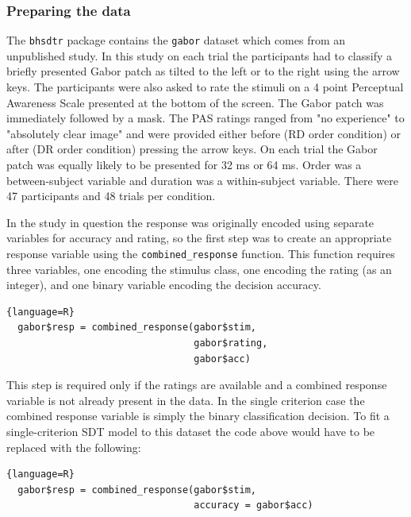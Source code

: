 \documentclass[oneside,a4paper]{article}
\begin{document}
\subsubsection{Preparing the data}

The \texttt{bhsdtr} package contains the \texttt{gabor} dataset which
comes from an unpublished study. In this study on each trial the
participants had to
classify a briefly presented Gabor patch as tilted to the left or to
the right using the arrow keys. The participants were also asked to
rate the stimuli on a 4 point Perceptual Awareness Scale
\cite{ramsoy2004introspection} presented at the bottom of the
screen. The Gabor patch was immediately followed by a mask. The PAS
ratings ranged from "no experience" to "absolutely clear image"
and %
were provided either before (RD order condition) or after (DR order
condition) %
pressing the arrow keys. On each trial the Gabor patch was equally
likely to be presented for 32 ms or 64 ms. Order was a between-subject
variable and duration was a within-subject variable. There were 47
participants and 48 trials per condition.

In the study in question the response was originally encoded using
separate variables for accuracy and rating, so the first step was to
create an appropriate response variable using the
\texttt{combined\_response} function. This function requires three
variables, one encoding the stimulus class, one encoding the rating
(as an integer), and one binary variable encoding the decision
accuracy.

\begin{lstlisting}{language=R}
  gabor$resp = combined_response(gabor$stim, 
                                 gabor$rating, 
                                 gabor$acc)
\end{lstlisting}

This step is required only if the ratings are available and a combined
response variable is not already present in the data. In the single
criterion case the combined response variable is simply the binary
classification decision. To fit a single-criterion SDT model to this
dataset the code above would have to be replaced with the following:

\begin{lstlisting}{language=R}
  gabor$resp = combined_response(gabor$stim, 
                                 accuracy = gabor$acc)
\end{lstlisting}
\end{document}
